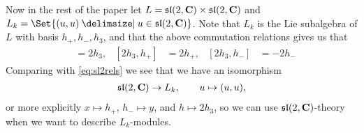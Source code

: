 Now in the rest of the paper let $L=\mathfrak{sl}(2,\mathbf{C})\times \mathfrak{sl}(2,\mathbf{C})$ and $L_k=\Set{(u,u)\given u\in\slc}$. Note that $L_k$ is the Lie subalgebra of $L$ with basis $h_+,h_-,h_3$, and that the above commutation relations gives us that 
\begin{align*}
  [h_+,h_-] &= 2h_3, & [2h_3,h_+] &= 2h_+, & [2h_3,h_-] &= -2h_-
\end{align*}
Comparing with \cref{eq:sl2rels} we see that we have an isomorphism
\begin{align}
  \mathfrak{sl}(2,\mathbf{C})\to L_k,\qquad u\mapsto (u,u), \label{eq:sl2iso}
\end{align}
or more explicitly $x\mapsto h_+$, $h_-\mapsto y$, and $h\mapsto 2h_3$, so we can use $\mathfrak{sl}(2,\mathbf{C})$-theory when we want to describe $L_k$-modules.

